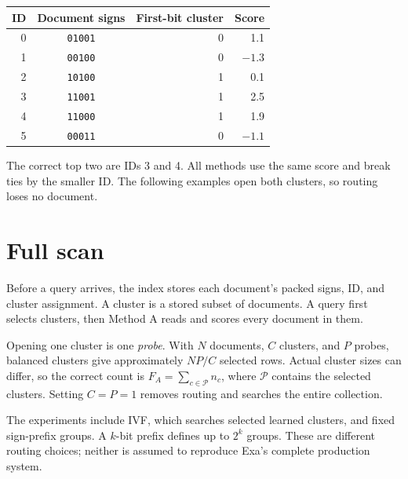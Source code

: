 \documentclass[11pt,a4paper]{article}
\begin{document}
\begin{center}
\begin{tabular}{@{}rcrr@{}}\toprule
ID & Document signs & First-bit cluster & Score\\\midrule
0 & \texttt{01001} & 0 & 1.1\\
1 & \texttt{00100} & 0 & $-1.3$\\
2 & \texttt{10100} & 1 & 0.1\\
3 & \texttt{11001} & 1 & 2.5\\
4 & \texttt{11000} & 1 & 1.9\\
5 & \texttt{00011} & 0 & $-1.1$\\\bottomrule
\end{tabular}
\end{center}
The correct top two are IDs 3 and 4. All methods use the same score and break ties by the
smaller ID. The following examples open both clusters, so routing loses no document.

\newpage
\section{Full scan}
\label{sec:scan}
Before a query arrives, the index stores each document's packed signs, ID, and cluster
assignment. A cluster is a stored subset of documents. A query first selects clusters,
then Method A reads and scores every document in them.

\begin{center}
\end{center}

Opening one cluster is one \emph{probe}. With $N$ documents, $C$ clusters, and $P$ probes,
balanced clusters give approximately $NP/C$ selected rows. Actual cluster sizes can differ,
so the correct count is $F_A=\sum_{c\in\mathcal P}n_c$, where $\mathcal P$ contains the selected
clusters. Setting $C=P=1$ removes routing and searches the entire collection.

The experiments include IVF, which searches selected learned clusters, and fixed sign-prefix groups.
A $k$-bit prefix defines up to $2^k$ groups. These are different routing choices; neither is
assumed to reproduce Exa's complete production system.
\end{document}
